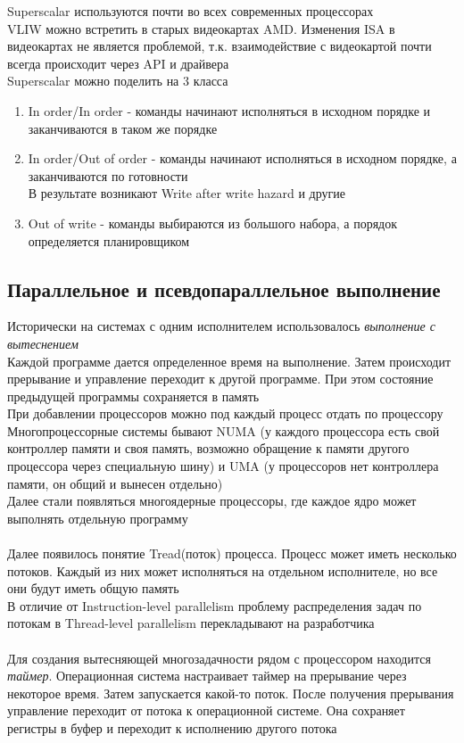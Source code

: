 \documentclass[12pt]{article}
\begin{document}
Superscalar используются почти во всех современных процессорах\\
VLIW можно встретить в старых видеокартах AMD. Изменения ISA в видеокартах не является проблемой, т.к. взаимодействие с видеокартой почти всегда происходит через API и драйвера\\
Superscalar можно поделить на 3 класса
\begin{enumerate}
    \item In order/In order - команды начинают исполняться в исходном порядке и заканчиваются в таком же порядке
    \item In order/Out of order - команды начинают исполняться в исходном порядке, а заканчиваются по готовности\\
    В результате возникают Write after write hazard и другие
    \item Out of write - команды выбираются из большого набора, а порядок определяется планировщиком
\end{enumerate}
\subsection{Параллельное и псевдопараллельное выполнение}
Исторически на системах с одним исполнителем использовалось \textit{выполнение с вытеснением}\\
Каждой программе дается определенное время на выполнение. Затем происходит прерывание и управление переходит к другой программе. При этом состояние предыдущей программы сохраняется в память\\
При добавлении процессоров можно под каждый процесс отдать по процессору\\
Многопроцессорные системы бывают NUMA (у каждого процессора есть свой контроллер памяти и своя память, возможно обращение к памяти другого процессора через специальную шину) и UMA (у процессоров нет контроллера памяти, он общий и вынесен отдельно)\\
Далее стали появляться многоядерные процессоры, где каждое ядро может выполнять отдельную программу\\\\
Далее появилось понятие Tread(поток) процесса. Процесс может иметь несколько потоков. Каждый из них может исполняться на отдельном исполнителе, но все они будут иметь общую память\\
В отличие от Instruction-level parallelism проблему распределения задач по потокам в Thread-level parallelism перекладывают на разработчика\\\\
Для создания вытесняющей многозадачности рядом с процессором находится \textit{таймер}. Операционная система настраивает таймер на прерывание через некоторое время. Затем запускается какой-то поток. После получения прерывания управление переходит от потока к операционной системе. Она сохраняет регистры в буфер и переходит к исполнению другого потока\\
\end{document}
